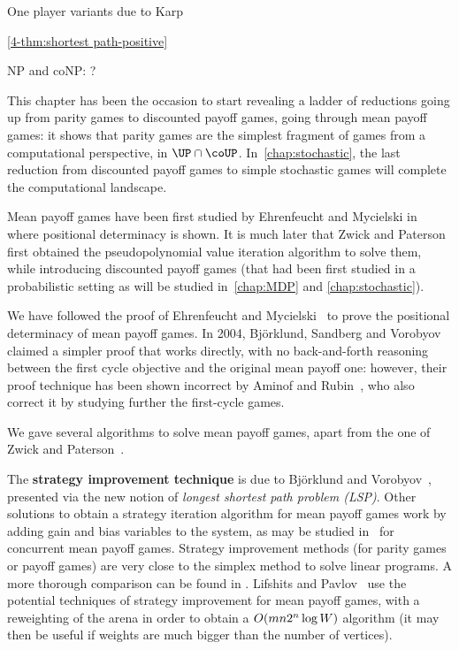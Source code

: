 One player variants due to Karp~\cite{Karp:1978}

\cref{4-thm:shortest path-positive}
\cite{Khachiyan&al:2008}

NP and coNP: \cite{Puri:1995}?

This chapter has been the occasion to start revealing a ladder of
reductions going up from parity games to discounted payoff games,
going through mean payoff games: it shows that parity games are the
simplest fragment of games from a computational perspective, in
$\UP\cap \coUP$. In~\cref{chap:stochastic}, the last reduction from
discounted payoff games to simple stochastic games will complete the
computational landscape.

Mean payoff games have been first studied by Ehrenfeucht and Mycielski
in~\cite{Ehrebfeucht&Mycielski:1979} where positional determinacy is
shown. It is much later that Zwick and
Paterson~\cite{Zwick&Paterson:1996} first obtained the
pseudopolynomial value iteration algorithm to solve them, while
introducing discounted payoff games (that had been first studied in a
probabilistic setting as will be studied in~\cref{chap:MDP} and
\cref{chap:stochastic}).

We have followed the proof of Ehrenfeucht and
Mycielski~\cite{Ehrebfeucht&Mycielski:1979} to prove the positional
determinacy of mean payoff games. In 2004, Bj\"orklund, Sandberg and
Vorobyov \cite{Bjorklund&Sandberg&Vorobyov:2004} claimed a simpler
proof that works directly, with no back-and-forth reasoning between
the first cycle objective and the original mean payoff one: however,
their proof technique has been shown incorrect by Aminof and
Rubin~\cite{Aminof&Rubin:2017}, who also correct it by studying
further the first-cycle games.

We gave several algorithms to solve mean payoff games, apart from the
one of Zwick and Paterson~\cite{Zwick&Paterson:1996}.

The \textbf{strategy improvement technique} is due to Bj\"orklund and
Vorobyov~\cite{Bjorklund&Vorobyov:2007}, presented via the new notion
of \emph{longest shortest path problem (LSP)}. Other solutions to
obtain a strategy iteration algorithm for mean payoff games work by
adding gain and bias variables to the system, as may be studied
in~\cite{Filar&Vrieze:1996} for concurrent mean payoff games.  Strategy
improvement methods (for parity games or payoff games) are very close
to the simplex method to solve linear programs. A more thorough
comparison can be found in \cite{Allamigeon&Benchimol&al:2014}.  Lifshits and
Pavlov~\cite{Lifshits&Pavlov:2007} use the potential techniques of strategy
improvement for mean payoff games, with a reweighting of the arena in
order to obtain a $O(mn2^{n}\log W)$ algorithm (it may
then be useful if weights are much bigger than the number of
vertices).


